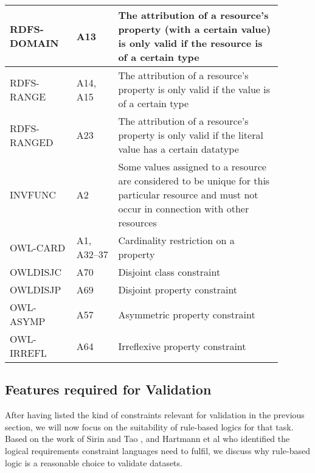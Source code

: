 \begin{table}
\begin{tabular}{ p{0.2\linewidth} p{0.14\linewidth} p{0.55\linewidth}  }
RDFS-DOMAIN & A13 &The attribution of a resource's property
(with a certain value) is only valid if the
resource is of a certain type\\ \midrule %
RDFS-RANGE & A14, A15 & The attribution of a resource's property is
only valid if the value is of a certain type\\ \midrule %
RDFS-RANGED & A23 &
The attribution of a resource's property is
only valid if the literal value has a certain
datatype\\ \midrule %
INVFUNC & A2 & Some values assigned to a resource are
considered to be unique for this particular
resource and must not occur in
connection with other resources\\ \midrule %
OWL-CARD & A1, A32--37 & Cardinality restriction on a property\\ \midrule %
OWLDISJC & A70 & Disjoint class constraint\\ \midrule %
OWLDISJP & A69 & Disjoint property constraint\\ \midrule %
OWL-ASYMP & A57 & Asymmetric property constraint\\ \midrule %
OWL-IRREFL & A64 & Irreflexive property constraint \\ \bottomrule
\end{tabular}
\end{table}
\normalsize



\subsection{Features required for Validation}\label{logic}
After having listed the kind of constraints relevant for \rdf validation in the previous section, we will now focus on the suitability of rule-based logics for that task.
Based on the work of Sirin and Tao \cite{sirin2009towards}, and Hartmann et al \cite{bosch2015} who identified the logical requirements constraint 
languages need to fulfil,
we discuss why rule-based logic is a reasonable choice to validate \rdf datasets.




